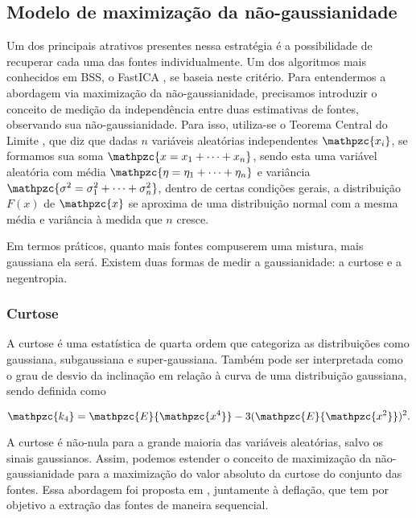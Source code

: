 \subsection{Modelo de maximização da não-gaussianidade}
    
    Um dos principais atrativos presentes nessa estratégia é a possibilidade de recuperar cada uma das fontes individualmente. Um dos algoritmos mais conhecidos em BSS, o FastICA \cite{fastica1}, se baseia neste critério. Para entendermos a abordagem via maximização da não-gaussianidade, precisamos introduzir o conceito de medição da independência entre duas estimativas de fontes, observando sua não-gaussianidade. Para isso, utiliza-se o Teorema Central do Limite \cite{cetrallimit}, que diz que dadas $n$ variáveis aleatórias independentes $\mathpzc{x_i}$, se formamos sua soma $\mathpzc{x = x_1 + \dots + x_n}$, sendo esta uma variável aleatória com média $\mathpzc{\eta = \eta_1 + \dots + \eta_n}$ e variância $\mathpzc{\sigma^2 = \sigma_1^2 + \dots + \sigma_n^2}$, dentro de certas condições gerais, a distribuição ${F(x)}$ de $\mathpzc{x}$  se aproxima de uma distribuição normal com a mesma média e variância à medida que ${n}$ cresce.
    
    \medskip
    
    Em termos práticos, quanto mais fontes compuserem uma mistura, mais gaussiana ela será. Existem duas formas de medir a gaussianidade: a curtose e a negentropia.

\subsubsection{Curtose}
    
    A curtose é uma estatística de quarta ordem que categoriza as distribuições como gaussiana, subgaussiana e super-gaussiana. Também pode ser interpretada como o grau de desvio da inclinação em relação à curva de uma distribuição gaussiana, sendo definida como
    
    \begin{equation}
        \mathpzc{k_4} = \mathpzc{E}\{\mathpzc{x^4}\} - 3(\mathpzc{E}\{\mathpzc{x^2}\})^2.
    \end{equation} 
    
    A curtose é não-nula para a grande maioria das variáveis aleatórias, salvo os sinais gaussianos. Assim, podemos estender o conceito de maximização da não-gaussianidade para a maximização do valor absoluto da curtose do conjunto das fontes. Essa abordagem foi proposta em \cite{ML}, juntamente à deflação, que tem por objetivo a extração das fontes de maneira sequencial.
    
